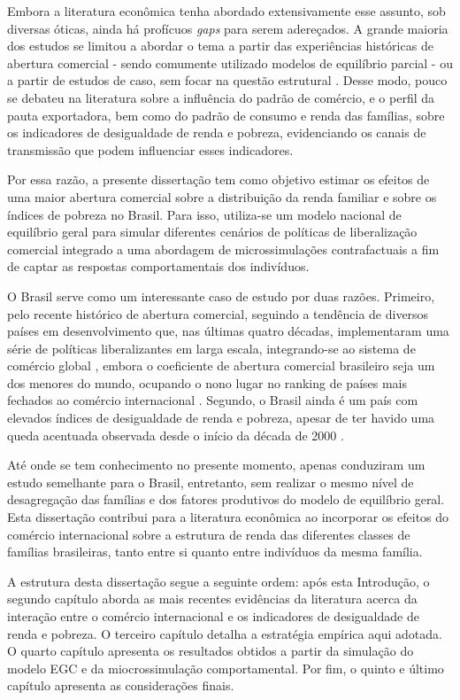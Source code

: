 Embora a literatura econômica tenha abordado extensivamente esse assunto, sob diversas óticas, ainda há profícuos \textit{gaps} para serem adereçados. A grande maioria dos estudos se limitou a abordar o tema a partir das experiências históricas de abertura comercial - sendo comumente utilizado modelos de equilíbrio parcial \cite{castilho12, bayar17} - ou a partir de estudos de caso, sem focar na questão estrutural \cite{borrazetal12, estrades12, campostimini22}. Desse modo, pouco se debateu na literatura sobre a influência do padrão de comércio, e o perfil da pauta exportadora, bem como do padrão de consumo e renda das famílias, sobre os indicadores de desigualdade de renda e pobreza, evidenciando os canais de transmissão que podem influenciar esses indicadores. 

Por essa razão, a presente dissertação tem como objetivo estimar os efeitos de uma maior abertura comercial sobre a distribuição da renda familiar e sobre os índices de pobreza no Brasil. Para isso, utiliza-se um modelo nacional de equilíbrio geral para simular diferentes cenários de políticas de liberalização comercial integrado a uma abordagem de microssimulações contrafactuais a fim de captar as respostas comportamentais dos indivíduos.

O Brasil serve como um interessante caso de estudo por duas razões. Primeiro, pelo recente histórico de abertura comercial, seguindo a tendência de diversos países em desenvolvimento que, nas últimas quatro décadas, implementaram uma série de políticas liberalizantes em larga escala, integrando-se ao sistema de comércio global \cite{pavcnik17}, embora o coeficiente de abertura comercial brasileiro seja um dos menores do mundo, ocupando o nono lugar no ranking de países mais fechados ao comércio internacional \cite{ourworldindata}. Segundo, o Brasil ainda é um país com elevados índices de desigualdade de renda e pobreza, apesar de ter havido uma queda acentuada observada desde o início da década de 2000 \cite{ocde15}.

Até onde se tem conhecimento no presente momento, apenas \textcite{carneiro06, ferreira06} conduziram um estudo semelhante para o Brasil, entretanto, sem realizar o mesmo nível de desagregação das famílias e dos fatores produtivos do modelo de equilíbrio geral. Esta dissertação contribui para a literatura econômica ao incorporar os efeitos do comércio internacional sobre a estrutura de renda das diferentes classes de famílias brasileiras, tanto entre si quanto entre indivíduos da mesma família.

A estrutura desta dissertação segue a seguinte ordem: após esta Introdução, o segundo capítulo aborda as mais recentes evidências da literatura acerca da interação entre o comércio internacional e os indicadores de desigualdade de renda e pobreza. O terceiro capítulo detalha a estratégia empírica aqui adotada. O quarto capítulo apresenta os resultados obtidos a partir da simulação do modelo EGC e da miocrossimulação comportamental. Por fim, o quinto e último capítulo apresenta as considerações finais.



